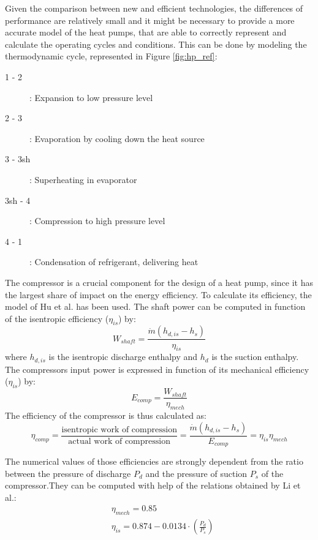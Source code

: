 \documentclass{article}
\begin{document}
Given the comparison between new and efficient technologies, the differences of performance are relatively small and it might be necessary to provide a more accurate model of the heat pumps, that are able to correctly represent and calculate the operating cycles and conditions. This can be done by modeling the thermodynamic cycle, represented in Figure \ref{fig:hp_ref}:

\begin{description}
	\item [1 - 2]: Expansion to low pressure level
	\item [2 - 3]: Evaporation by cooling down the heat source
	\item [3 - 3sh]: Superheating in evaporator
	\item [3sh - 4]: Compression to high pressure level
	\item [4 - 1]: Condensation of refrigerant, delivering heat
\end{description}

The compressor is a crucial component for the design of a heat pump, since it has the largest share of impact on the energy efficiency. To calculate its efficiency, the model of Hu et al.\cite{huExtremumSeekingControl2015} has been used. The shaft power can be computed in function of the isentropic efficiency ($\eta_{is}$) by:
\begin{equation}
W_{shaft} = \frac{\dot{m}(h_{d,is}-h_{s})}{\eta_{is}} 
\end{equation}
where $h_{d,is}$ is the isentropic discharge enthalpy and $h_{d}$ is the suction enthalpy. The compressors input power is expressed in function of its mechanical efficiency ($\eta_{is}$) by:
\begin{equation}
E_{comp} = \frac{W_{shaft}}{\eta_{mech}}  
\end{equation}
The efficiency of the compressor is thus calculated as:
\begin{equation}
\eta_{comp} = \frac{\text{isentropic work of compression}}{\text{actual work of compression}} = \frac{\dot{m}(h_{d,is}-h_{s})}{E_{comp}} = \eta_{is}\eta_{mech} 
\end{equation}

The numerical values of those efficiencies are strongly dependent from the ratio between the pressure of discharge $P_{d}$ and the pressure of suction $P_{s}$ of the compressor.They can be computed with help of the relations obtained by Li et al.\cite{liPerformanceCharacteristicsR1234yf2014}:
\begin{align}
& \eta_{mech} = 0.85\\
& \eta_{is} = 0.874-0.0134\cdot(\frac{P_{d}}{P_{s}})\\
\end{align}
		
\end{document}
